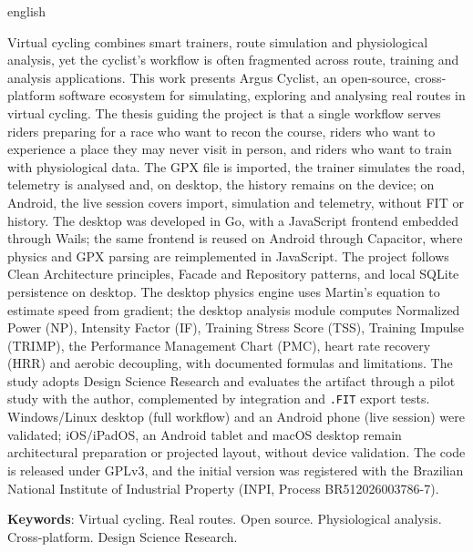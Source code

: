 
\begin{resumo}[Abstract]
\begin{otherlanguage*}{english}

Virtual cycling combines smart trainers, route simulation and physiological
analysis, yet the cyclist's workflow is often fragmented across route, training
and analysis applications. This work presents Argus Cyclist, an open-source,
cross-platform software ecosystem for simulating, exploring and analysing real
routes in virtual cycling. The thesis guiding the project is that a single
workflow serves riders preparing for a race who want to recon the course, riders
who want to experience a place they may never visit in person, and riders who
want to train with physiological data. The GPX file is imported, the trainer
simulates the road, telemetry is analysed and, on desktop, the history remains
on the device; on Android, the live session covers import, simulation and
telemetry, without FIT or history. The desktop was developed in Go, with a
JavaScript frontend embedded through Wails; the same frontend is reused on
Android through Capacitor, where physics and GPX parsing are reimplemented in
JavaScript. The project follows Clean Architecture principles, Facade and
Repository patterns, and local SQLite persistence on desktop. The desktop
physics engine uses Martin's equation to estimate speed from gradient; the
desktop analysis module computes Normalized Power (NP), Intensity Factor (IF),
Training Stress Score (TSS), Training Impulse (TRIMP), the Performance
Management Chart (PMC), heart rate recovery (HRR) and aerobic decoupling, with
documented formulas and limitations. The study adopts Design Science Research
and evaluates the artifact through a pilot study with the author, complemented
by integration and \texttt{.FIT} export tests. Windows/Linux desktop (full
workflow) and an Android phone (live session) were validated; iOS/iPadOS, an
Android tablet and macOS desktop remain architectural preparation or projected
layout, without device validation. The code is released
under GPLv3, and the initial version was registered with the Brazilian National
Institute of Industrial Property (INPI, Process BR512026003786-7).

\textbf{Keywords}: Virtual cycling. Real routes. Open source. Physiological
analysis. Cross-platform. Design Science Research.

\end{otherlanguage*}
\end{resumo}
